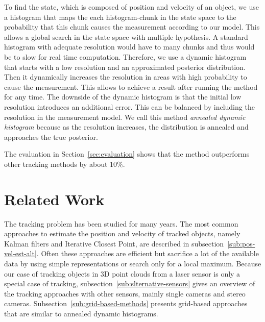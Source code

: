 \documentclass[twoside,a4paper,article]{combine}
\begin{document}
To find the state, which is composed of position and velocity of an
object, we use a histogram that maps the each histogram-chunk in the
state space to the probability that this chunk causes the measurement
according to our model. This allows a global search in the state space
with multiple hypothesis. A standard histogram with adequate
resolution would have to many chunks and thus would be to slow for
real time computation. Therefore, we use a dynamic histogram that
starts with a low resolution and an approximated posterior
distribution. Then it dynamically increases the resolution in areas
with high probability to cause the measurement. This allows to achieve
a result after running the method for any time. The downside of the
dynamic histogram is that the initial low resolution introduces an
additional error. This can be balanced by including the resolution in
the measurement model. We call this method \textit{annealed dynamic
  histogram} because as the resolution increases, the distribution is
annealed and approaches the true posterior.

The evaluation in Section~\ref{sec:evaluation} shows that the method
outperforms other tracking methods by about $10\%$.

\section{Related Work}
\label{sec:related-work}
The tracking problem has been studied for many years. The most common
approaches to estimate the position and velocity of tracked objects,
namely Kalman filters and Iterative Closest Point,
are described in subsection~\ref{sub:pos-vel-est-alt}. Often these
approaches are efficient but sacrifice a lot of the available data by
using simple representations or search only for a local maximum.
Because
our case of tracking objects in 3D point clouds from a laser sensor is
only a special case of tracking,
subsection~\ref{sub:slternative-sensors} gives an overview of the
tracking approaches with other sensors, mainly single cameras and
stereo cameras.
Subsection~\ref{sub:grid-based-methods} presents
grid-based approaches that are similar to annealed dynamic histograms.
\end{document}

